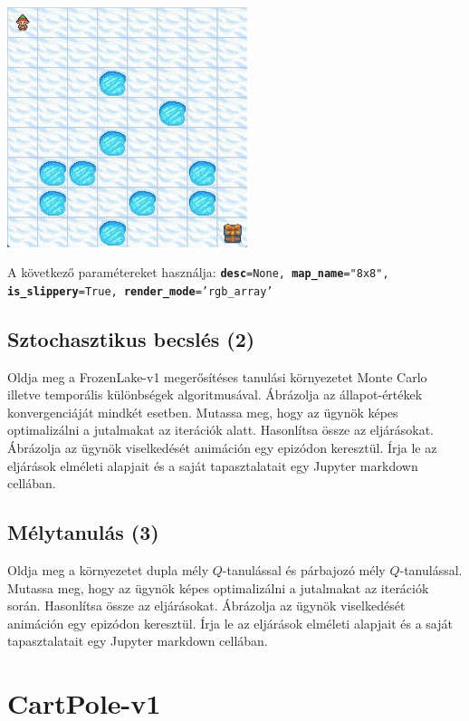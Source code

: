 \documentclass[english]{article}
\begin{document}
\begin{center}
\includegraphics[width=7cm, keepaspectratio]{images/frozenlake.jpg}
\end{center}

A következő paramétereket használja: 
\texttt{\textbf{desc}=None, \textbf{map\_name}="8x8", \textbf{is\_slippery}=True, \textbf{render\_mode}='rgb\_array'}

\subsection{Sztochasztikus becslés (2)}

Oldja meg a FrozenLake-v1 megerősítéses tanulási környezetet Monte Carlo illetve temporális különbségek algoritmusával. Ábrázolja az állapot-értékek konvergenciáját mindkét esetben. Mutassa meg, hogy az ügynök képes optimalizálni a jutalmakat az iterációk alatt. Hasonlítsa össze az eljárásokat. Ábrázolja az ügynök viselkedését animáción egy epizódon keresztül. Írja le az eljárások elméleti alapjait és a saját tapasztalatait egy Jupyter markdown cellában. 

\subsection{Mélytanulás (3)}

Oldja meg a környezetet dupla mély $Q$-tanulással és párbajozó mély $Q$-tanulással. Mutassa meg, hogy az ügynök képes optimalizálni a jutalmakat az iterációk során. Hasonlítsa össze az eljárásokat. Ábrázolja az ügynök viselkedését animáción egy epizódon keresztül. Írja le az eljárások elméleti alapjait és a saját tapasztalatait egy Jupyter markdown cellában. 

\section{CartPole-v1}
\end{document}
